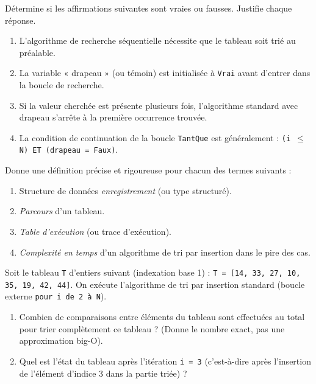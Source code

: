 \documentclass[11pt]{article}
\begin{document}
\begin{exercice}
Détermine si les affirmations suivantes sont vraies ou fausses. Justifie chaque réponse.
\begin{enumerate}
    \item L'algorithme de recherche séquentielle nécessite que le tableau soit trié au préalable.
    \item La variable « drapeau » (ou témoin) est initialisée à \texttt{Vrai} avant d'entrer dans la boucle de recherche.
    \item Si la valeur cherchée est présente plusieurs fois, l'algorithme standard avec drapeau s'arrête à la première occurrence trouvée.
    \item La condition de continuation de la boucle \texttt{TantQue} est généralement : \texttt{(i $\le$ N) ET (drapeau = Faux)}.
\end{enumerate}
\end{exercice}

\begin{exercice}
Donne une définition précise et rigoureuse pour chacun des termes suivants :
\begin{enumerate}
    \item Structure de données \emph{enregistrement} (ou type structuré).
    \item \emph{Parcours} d'un tableau.
    \item \emph{Table d'exécution} (ou trace d'exécution).
    \item \emph{Complexité en temps} d'un algorithme de tri par insertion dans le pire des cas.
\end{enumerate}
\end{exercice}

\begin{exercice}
Soit le tableau \texttt{T} d'entiers suivant (indexation base 1) : \texttt{T = [14, 33, 27, 10, 35, 19, 42, 44]}.
On exécute l'algorithme de tri par insertion standard (boucle externe \texttt{pour i de 2 à N}).
\begin{enumerate}
    \item Combien de comparaisons entre éléments du tableau sont effectuées au total pour trier complètement ce tableau ? (Donne le nombre exact, pas une approximation big-O).
    \item Quel est l'état du tableau après l'itération \texttt{i = 3} (c'est-à-dire après l'insertion de l'élément d'indice 3 dans la partie triée) ?
\end{enumerate}
\end{exercice}
\end{document}
